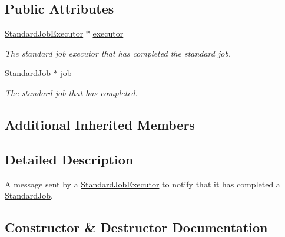 \subsection*{Public Attributes}
\begin{DoxyCompactItemize}
\item 
\mbox{\label{classwrench_1_1_standard_job_executor_done_message_ae655453e7f62d556a3ffd9ae0e60e87d}} 
\hyperlink{classwrench_1_1_standard_job_executor}{Standard\+Job\+Executor} $\ast$ \hyperlink{classwrench_1_1_standard_job_executor_done_message_ae655453e7f62d556a3ffd9ae0e60e87d}{executor}
\begin{DoxyCompactList}\small\item\em The standard job executor that has completed the standard job. \end{DoxyCompactList}\item 
\mbox{\label{classwrench_1_1_standard_job_executor_done_message_a16beda555e2878276fd7df649834867d}} 
\hyperlink{classwrench_1_1_standard_job}{Standard\+Job} $\ast$ \hyperlink{classwrench_1_1_standard_job_executor_done_message_a16beda555e2878276fd7df649834867d}{job}
\begin{DoxyCompactList}\small\item\em The standard job that has completed. \end{DoxyCompactList}\end{DoxyCompactItemize}
\subsection*{Additional Inherited Members}


\subsection{Detailed Description}
A message sent by a \hyperlink{classwrench_1_1_standard_job_executor}{Standard\+Job\+Executor} to notify that it has completed a \hyperlink{classwrench_1_1_standard_job}{Standard\+Job}. 

\subsection{Constructor \& Destructor Documentation}
\mbox{\label{classwrench_1_1_standard_job_executor_done_message_afdd5b2d090ce6f066ffd5fcda8609955}} 
